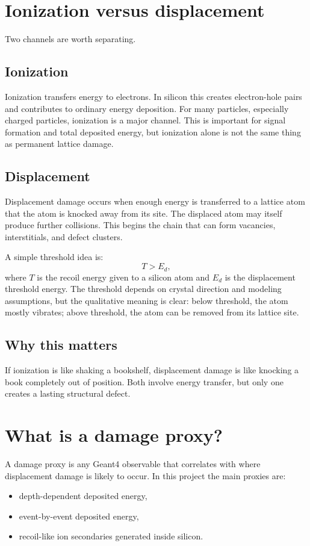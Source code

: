 \documentclass[11pt]{article}
\begin{document}
\section{Ionization versus displacement}
Two channels are worth separating.

\subsection{Ionization}
Ionization transfers energy to electrons. In silicon this creates electron-hole pairs and contributes to ordinary energy deposition. For many particles, especially charged particles, ionization is a major channel. This is important for signal formation and total deposited energy, but ionization alone is not the same thing as permanent lattice damage.

\subsection{Displacement}
Displacement damage occurs when enough energy is transferred to a lattice atom that the atom is knocked away from its site. The displaced atom may itself produce further collisions. This begins the chain that can form vacancies, interstitials, and defect clusters.

A simple threshold idea is:
\begin{equation}
T > E_d,
\end{equation}
where $T$ is the recoil energy given to a silicon atom and $E_d$ is the displacement threshold energy. The threshold depends on crystal direction and modeling assumptions, but the qualitative meaning is clear: below threshold, the atom mostly vibrates; above threshold, the atom can be removed from its lattice site.

\subsection{Why this matters}
If ionization is like shaking a bookshelf, displacement damage is like knocking a book completely out of position. Both involve energy transfer, but only one creates a lasting structural defect.

\section{What is a damage proxy?}
A damage proxy is any Geant4 observable that correlates with where displacement damage is likely to occur. In this project the main proxies are:
\begin{itemize}
    \item depth-dependent deposited energy,
    \item event-by-event deposited energy,
    \item recoil-like ion secondaries generated inside silicon.
\end{itemize}
\end{document}
